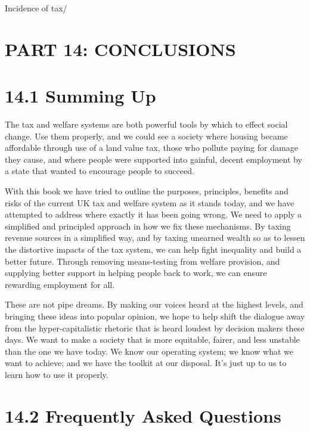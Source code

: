 \documentclass[]{tufte-handout}
\begin{document}
Incidence of tax/

\newpage

\hypertarget{part-14-conclusions}{%
\section{PART 14: CONCLUSIONS}\label{part-14-conclusions}}

\hypertarget{summing-up}{%
\section{14.1 Summing Up}\label{summing-up}}

The tax and welfare systems are both powerful tools by which to effect
social change. Use them properly, and we could see a society where
housing became affordable through use of a land value tax, those who
pollute paying for damage they cause, and where people were supported
into gainful, decent employment by a state that wanted to encourage
people to succeed.

With this book we have tried to outline the purposes, principles,
benefits and risks of the current UK tax and welfare system as it stands
today, and we have attempted to address where exactly it has been going
wrong. We need to apply a simplified and principled approach in how we
fix these mechanisms. By taxing revenue sources in a simplified way, and
by taxing unearned wealth so as to lessen the distortive impacts of the
tax system, we can help fight inequality and build a better future.
Through removing means-testing from welfare provision, and supplying
better support in helping people back to work, we can ensure rewarding
employment for all.

These are not pipe dreams. By making our voices heard at the highest
levels, and bringing these ideas into popular opinion, we hope to help
shift the dialogue away from the hyper-capitalistic rhetoric that is
heard loudest by decision makers these days. We want to make a society
that is more equitable, fairer, and less unstable than the one we have
today. We know our operating system; we know what we want to achieve;
and we have the toolkit at our disposal. It's just up to us to learn how
to use it properly.

\hypertarget{frequently-asked-questions}{%
\section{14.2 Frequently Asked
Questions}\label{frequently-asked-questions}}
\end{document}
